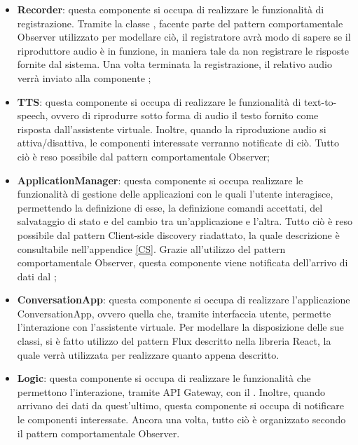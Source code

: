 \begin{itemize}
	\item \textbf{Recorder}: questa componente si occupa di realizzare le funzionalità di registrazione. Tramite la classe , facente parte del pattern comportamentale Observer utilizzato per modellare ciò, il registratore avrà modo di sapere se il riproduttore audio è in funzione, in maniera tale da non registrare le risposte fornite dal sistema. Una volta terminata la registrazione, il relativo audio verrà inviato alla componente ;
	\newpage
	\item \textbf{TTS}: questa componente si occupa di realizzare le funzionalità di text-to-speech, ovvero di riprodurre sotto forma di audio il testo fornito come risposta dall'assistente virtuale. Inoltre, quando la riproduzione audio si attiva/disattiva, le componenti interessate verranno notificate di ciò. Tutto ciò è reso possibile dal pattern comportamentale Observer;
	\item \textbf{ApplicationManager}: questa componente si occupa realizzare le funzionalità di gestione delle applicazioni con le quali l'utente interagisce, permettendo la definizione di esse, la definizione comandi accettati, del salvataggio di stato e del cambio tra un'applicazione e l'altra. Tutto ciò è reso possibile dal pattern Client-side discovery riadattato, la quale descrizione è consultabile nell'appendice \ref{CS}. Grazie all'utilizzo del pattern comportamentale Observer, questa componente viene notificata dell'arrivo di dati dal ;
	\item \textbf{ConversationApp}: questa componente si occupa di realizzare l'applicazione ConversationApp, ovvero quella che, tramite interfaccia utente, permette l'interazione con l'assistente virtuale. Per modellare la disposizione delle sue classi, si è fatto utilizzo del pattern Flux descritto nella libreria React, la quale verrà utilizzata per realizzare quanto appena descritto. 
	\item \textbf{Logic}: questa componente si occupa di realizzare le funzionalità che permettono l'interazione, tramite API Gateway, con il . Inoltre, quando arrivano dei dati da quest'ultimo, questa componente si occupa di notificare le componenti interessate. Ancora una volta, tutto ciò è organizzato secondo il pattern comportamentale Observer.
\end{itemize}
